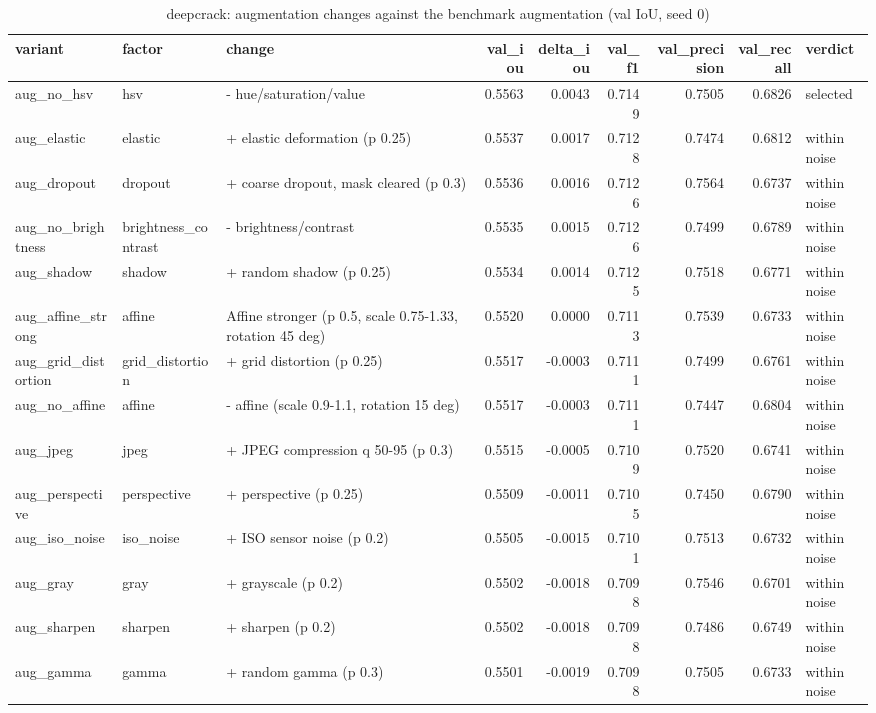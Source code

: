 \begin{table}
\caption{deepcrack: augmentation changes against the benchmark augmentation (val IoU, seed 0)}
\label{tab:ablation_deepcrack_augmentation}
\begin{tabular}{lllrrrrrl}
\toprule
variant & factor & change & val\_iou & delta\_iou & val\_f1 & val\_precision & val\_recall & verdict \\
\midrule
aug\_no\_hsv & hsv & - hue/saturation/value & 0.5563 & 0.0043 & 0.7149 & 0.7505 & 0.6826 & selected \\
aug\_elastic & elastic & + elastic deformation (p 0.25) & 0.5537 & 0.0017 & 0.7128 & 0.7474 & 0.6812 & within noise \\
aug\_dropout & dropout & + coarse dropout, mask cleared (p 0.3) & 0.5536 & 0.0016 & 0.7126 & 0.7564 & 0.6737 & within noise \\
aug\_no\_brightness & brightness\_contrast & - brightness/contrast & 0.5535 & 0.0015 & 0.7126 & 0.7499 & 0.6789 & within noise \\
aug\_shadow & shadow & + random shadow (p 0.25) & 0.5534 & 0.0014 & 0.7125 & 0.7518 & 0.6771 & within noise \\
aug\_affine\_strong & affine & Affine stronger (p 0.5, scale 0.75-1.33, rotation 45 deg) & 0.5520 & 0.0000 & 0.7113 & 0.7539 & 0.6733 & within noise \\
aug\_grid\_distortion & grid\_distortion & + grid distortion (p 0.25) & 0.5517 & -0.0003 & 0.7111 & 0.7499 & 0.6761 & within noise \\
aug\_no\_affine & affine & - affine (scale 0.9-1.1, rotation 15 deg) & 0.5517 & -0.0003 & 0.7111 & 0.7447 & 0.6804 & within noise \\
aug\_jpeg & jpeg & + JPEG compression q 50-95 (p 0.3) & 0.5515 & -0.0005 & 0.7109 & 0.7520 & 0.6741 & within noise \\
aug\_perspective & perspective & + perspective (p 0.25) & 0.5509 & -0.0011 & 0.7105 & 0.7450 & 0.6790 & within noise \\
aug\_iso\_noise & iso\_noise & + ISO sensor noise (p 0.2) & 0.5505 & -0.0015 & 0.7101 & 0.7513 & 0.6732 & within noise \\
aug\_gray & gray & + grayscale (p 0.2) & 0.5502 & -0.0018 & 0.7098 & 0.7546 & 0.6701 & within noise \\
aug\_sharpen & sharpen & + sharpen (p 0.2) & 0.5502 & -0.0018 & 0.7098 & 0.7486 & 0.6749 & within noise \\
aug\_gamma & gamma & + random gamma (p 0.3) & 0.5501 & -0.0019 & 0.7098 & 0.7505 & 0.6733 & within noise \\

\end{tabular}
\end{table}
